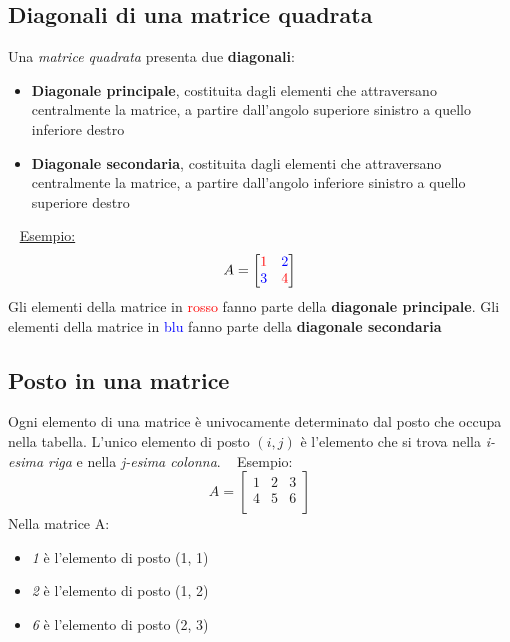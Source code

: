 \documentclass[12pt,oneside]{book}
\begin{document}
\subsection{Diagonali di una matrice quadrata}
Una \emph{matrice quadrata} presenta due \textbf{diagonali}:
\begin{itemize}
    \item \textbf{Diagonale principale}, costituita dagli elementi che attraversano centralmente la matrice,
          a partire dall'angolo superiore sinistro a quello inferiore destro
    \item \textbf{Diagonale secondaria}, costituita dagli elementi che attraversano centralmente la matrice,
          a partire dall'angolo inferiore sinistro a quello superiore destro
\end{itemize}
~\newline
\underline{Esempio:}
\begin{equation*}
    A =
    \begin{bmatrix}
        \color{red}1  & \color{blue}2 \\
        \color{blue}3 & \color{red}4  \\
    \end{bmatrix}
\end{equation*}
Gli elementi della matrice in \textcolor{red}{rosso}
fanno parte della \textbf{diagonale principale}. Gli elementi della matrice in \textcolor{blue}{blu} fanno
parte della \textbf{diagonale secondaria}

\subsection{Posto in una matrice}
Ogni elemento di una matrice è univocamente determinato dal posto che occupa nella tabella.
L'unico elemento di posto $(i,j)$ è l'elemento che si trova nella \emph{i-esima riga} e nella
\emph{j-esima colonna}. \newline
~\newline
Esempio:
\begin{equation*}
    A =
    \begin{bmatrix}
        1 & 2 & 3 \\
        4 & 5 & 6 \\
    \end{bmatrix}
\end{equation*}
Nella matrice A:
\begin{itemize}
    \item \emph{1} è l'elemento di posto (1, 1)
    \item \emph{2} è l'elemento di posto (1, 2)
    \item \emph{6} è l'elemento di posto (2, 3)
\end{itemize}
\end{document}

